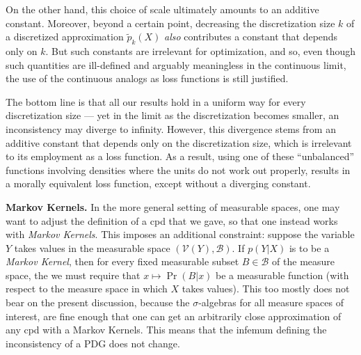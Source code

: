 \documentclass[twoside]{article}
\theoremstyle{plain}
\theoremstyle{definition}
\newcommand{\V}{\mathcal V}
\newcommand{\TODO}[1][INCOMPLETE]{{\centering\Large\color{red}$\langle$~\texttt{#1}~$\rangle$\par}}
\begin{document}
On the other hand, this choice of scale ultimately amounts to an additive constant.
Moreover, beyond a certain point, decreasing the discretization size $k$ of a discretized approximation $\tilde p_k(X)$ \emph{also} contributes a constant that depends only on $k$.
But such constants are irrelevant for optimization, and so, even though such quantities are ill-defined and arguably meaningless in the continuous limit, the use of the continuous analogs as loss functions is still justified.


The bottom line is that all our results hold in a uniform way for every discretization size --- yet in the limit as the discretization becomes smaller, an inconsistency may diverge to infinity.
However, this divergence stems from an additive constant that depends only on the discretization size, which is irrelevant to its employment as a loss function.
As a result, using one of these ``unbalanced'' functions involving densities where the units do not work out properly, results in a morally equivalent loss function, except without a diverging constant.

\textbf{Markov Kernels.} In the more general setting of measurable spaces, one may want to adjust the definition of a cpd that we gave, so that one instead works with \emph{Markov Kernels}.
This imposes an additional constraint: suppose the variable $Y$ takes values in the measurable space $(\V(Y), \mathcal B)$. If $p(Y|X)$ is to be a \emph{Markov Kernel}, then for every fixed measurable subset $B \in \mathcal B$ of the measure space, the we must require that  $x \mapsto \Pr(B|x)$ be a measurable function (with respect to the measure space in which $X$ takes values).
This too mostly does not bear on the present discussion, because the $\sigma$-algebras for all measure spaces of interest, are fine enough that one can get an arbitrarily close approximation of any cpd with a Markov Kernels.
This means that the infemum defining the inconsistency of a PDG does not change.
\end{document}
